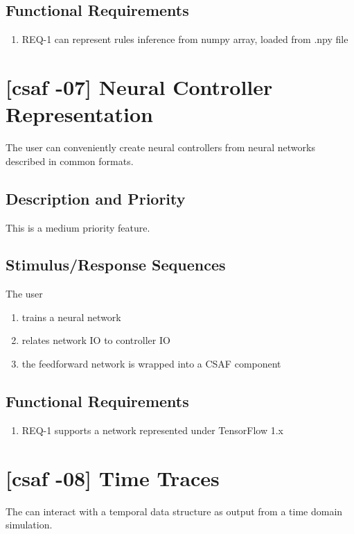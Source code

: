 \subsection{Functional Requirements}

\begin{enumerate}
\item REQ-1 \quad can represent rules inference from numpy array, loaded from .npy file
\end{enumerate}


\section{[\acrshort{csaf} -07] Neural Controller Representation}
The user can conveniently create neural controllers from neural networks described in common formats.

\subsection{Description and Priority}
This is a medium priority feature.

\subsection{Stimulus/Response Sequences}
The user
\begin{enumerate}
\item trains a neural network
\item relates network IO to controller IO
\item the feedforward network is wrapped into a CSAF component
\end{enumerate}

\subsection{Functional Requirements}
\begin{enumerate}
\item REQ-1 \quad supports a network represented under TensorFlow 1.x
\end{enumerate}

\section{[\acrshort{csaf} -08] Time Traces}

The can interact with a temporal data structure as output from a time domain simulation.

